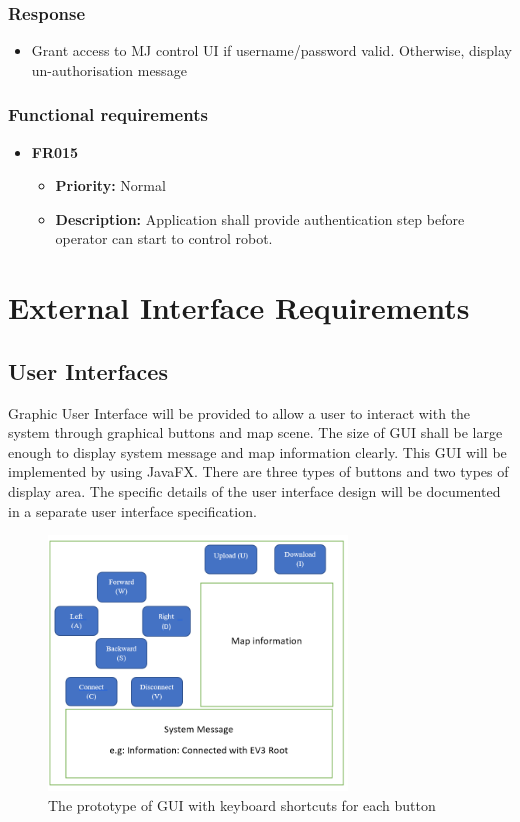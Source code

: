 \documentclass[10pt,a4paper,titlepage]{article}
\begin{document}
	\subsubsection*{Response}
	\begin{itemize}
		\item Grant access to MJ control UI if username/password valid. Otherwise, display un-authorisation message
	\end{itemize}
	
	\subsubsection{Functional requirements}
	\begin{itemize}
		\item \textbf{FR015}
		\begin{itemize}
			\item \textbf{Priority:} Normal
			\item \textbf{Description:} Application shall provide authentication step before operator can start to control robot.
		\end{itemize} 
		
	\end{itemize}
	
	\section{External Interface Requirements}
	\subsection{User Interfaces}
	Graphic User Interface will be provided to allow a user to interact with the system through graphical buttons and map scene. The size of GUI shall be large enough to display system message and map information clearly. This GUI will be implemented by using JavaFX. There are three types of buttons and two types of display area. The specific details of the user interface design will be documented in a separate user interface specification. 
	
	\begin{figure}[h]
		\centering
		\includegraphics[width=300px]{GUI.PNG}
		\caption{The prototype of GUI with keyboard shortcuts for each button}
		\label{fig:GUI with keyboard shortcuts}
	\end{figure}
	
\end{document}
